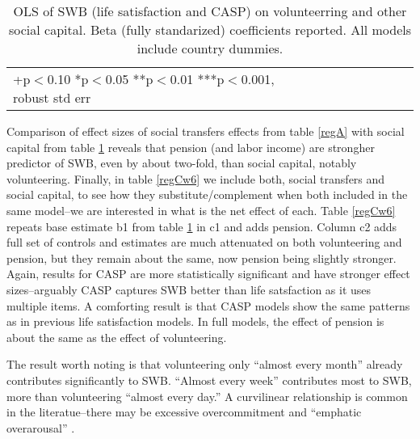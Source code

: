 \documentclass[10pt, letterpaper]{article}
\begin{document}
\begin{spacing}{1.4}
\begin{spacing}{.9}
\begin{table}[H]\centering \caption{OLS of SWB (life satisfaction and CASP) on volunteerring
    and other social capital. Beta (fully standarized) coefficients reported. All models
    include country dummies.}  \begin{scriptsize} \begin{tabular}{p{1.8in}p{.5in}p{.5in}p{.5in}p{.5in}|p{.5in}p{.5in}p{.5in}p{.5in}p{.5in}p{.4in}p{.5in}p{.4in}}\hline 
      \hline\multicolumn{5}{l}{+p$<$0.10 *p$<$0.05 **p$<$0.01 ***p$<$0.001,
        robust std err} \end{tabular}\label{regB} \end{scriptsize}\end{table}
\end{spacing}


Comparison of effect sizes of social transfers effects from table \ref{regA} with  
 social capital from table \ref{regB} reveals that pension (and labor income) are
 strongher  predictor of SWB, even by about two-fold,  than social capital, notably volunteering.
%
Finally, in table \ref{regCw6} we include both, social transfers and social
capital,  to see how they substitute/complement
when both included in the same model--we are interested in what is the net
effect of each.
%
Table \ref{regCw6} repeats base estimate b1 from table \ref{regB} in c1 and
adds pension. %
% 
Column c2 adds full set of controls and estimates are much attenuated
on both volunteering and pension, but they remain about the same, now pension
being slightly stronger.
%
Again, results for CASP are more statistically
significant and have stronger effect sizes--arguably CASP captures SWB better
than life satsfaction as it uses multiple items. A comforting result is
that CASP models show the same patterns as in previous life satisfaction
models. In full models, the effect of pension is about the same as the effect of volunteering.


The result worth noting is that volunteering only ``almost every month'' already
contributes significantly to SWB. ``Almost every week'' contributes most
to SWB, more than volunteering ``almost every day.'' A curvilinear
relationship is common in the literatue--there may be excessive overcommitment
and ``emphatic overarousal''  \citep{wilson12B}.%


\end{spacing}
\end{document}
